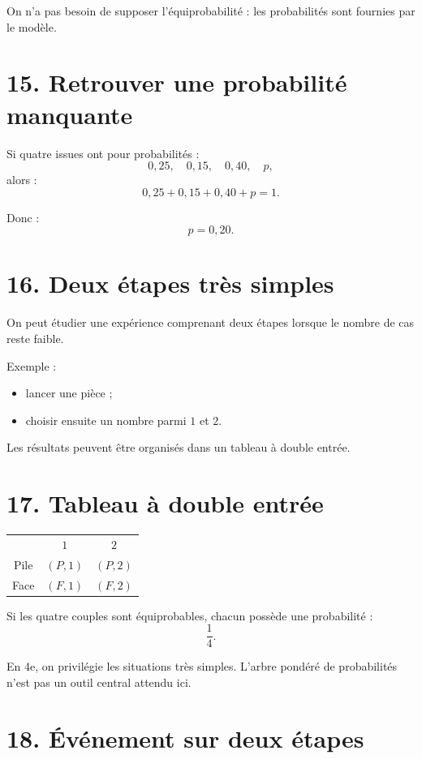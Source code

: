 On n'a pas besoin de supposer l'équiprobabilité : les probabilités sont fournies par le modèle.

\section{15. Retrouver une probabilité manquante}

Si quatre issues ont pour probabilités :
\[
0{,}25,\quad0{,}15,\quad0{,}40,\quad p,
\]
alors :
\[
0{,}25+0{,}15+0{,}40+p=1.
\]

Donc :
\[
p=0{,}20.
\]

\section{16. Deux étapes très simples}

On peut étudier une expérience comprenant deux étapes lorsque le nombre de cas reste faible.

Exemple :
\begin{itemize}
\item lancer une pièce ;
\item choisir ensuite un nombre parmi $1$ et $2$.
\end{itemize}

Les résultats peuvent être organisés dans un tableau à double entrée.

\section{17. Tableau à double entrée}

\begin{tabular}{c|c|c}
 & $1$ & $2$ \\
Pile & $(P,1)$ & $(P,2)$ \\
Face & $(F,1)$ & $(F,2)$ \\
\end{tabular}

Si les quatre couples sont équiprobables, chacun possède une probabilité :
\[
\dfrac14.
\]

\begin{remarque}
En 4e, on privilégie les situations très simples. L'arbre pondéré de probabilités n'est pas un outil central attendu ici.
\end{remarque}

\section{18. Événement sur deux étapes}


